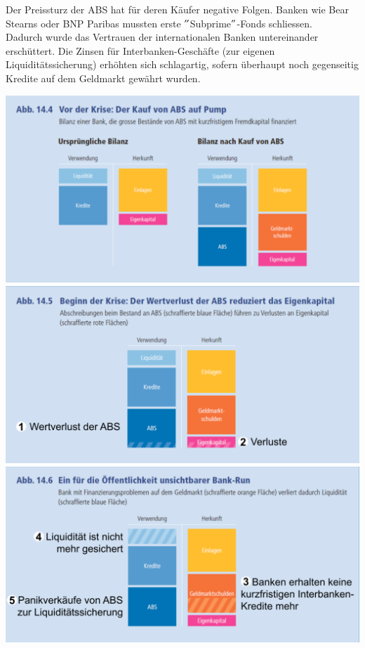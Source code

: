 Der Preissturz der ABS hat für deren Käufer negative Folgen. Banken wie Bear Stearns oder BNP Paribas mussten erste $"$Subprime$"$-Fonds schliessen.\\
Dadurch wurde das Vertrauen der internationalen Banken untereinander erschüttert. Die Zinsen für Interbanken-Geschäfte (zur eigenen Liquiditätssicherung) erhöhten sich schlagartig, sofern überhaupt noch gegenseitig Kredite auf dem Geldmarkt gewährt wurden.
\begin{multicols}{3}
	\includegraphics[width=\linewidth]{images/abs1.png}
	\columnbreak
	\includegraphics[width=\linewidth]{images/abs2.png}
	\columnbreak
	\includegraphics[width=\linewidth]{images/abs3.png}
\end{multicols}

